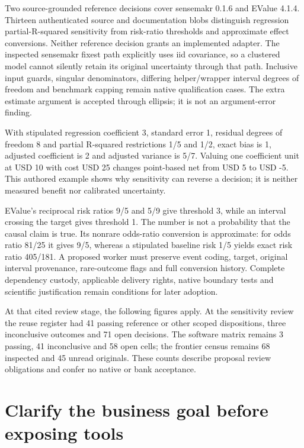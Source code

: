 Two source-grounded reference decisions cover sensemakr 0.1.6 and EValue
4.1.4. Thirteen authenticated source and documentation blobs distinguish
regression partial-R-squared sensitivity from risk-ratio thresholds and
approximate effect conversions. Neither reference decision grants an
implemented adapter. The inspected sensemakr fixest path explicitly uses
iid covariance, so a clustered model cannot silently retain its original
uncertainty through that path. Inclusive input guards, singular
denominators, differing helper/wrapper interval degrees of freedom and
benchmark capping remain native qualification cases. The extra estimate
argument is accepted through ellipsis; it is not an argument-error
finding. \citep{exec23_sensitivity_sensemakr}

With stipulated regression coefficient 3, standard error 1, residual
degrees of freedom 8 and partial R-squared restrictions 1/5 and 1/2,
exact bias is 1, adjusted coefficient is 2 and adjusted variance is 5/7.
Valuing one coefficient unit at USD 10 with cost USD 25 changes
point-based net from USD 5 to USD -5. This authored example shows why
sensitivity can reverse a decision; it is neither measured benefit nor
calibrated uncertainty. \citep{exec23_sensitivity_reference}

EValue's reciprocal risk ratios 9/5 and 5/9 give threshold 3, while an
interval crossing the target gives threshold 1. The number is not a
probability that the causal claim is true. Its nonrare odds-ratio
conversion is approximate: for odds ratio 81/25 it gives 9/5, whereas a
stipulated baseline risk 1/5 yields exact risk ratio 405/181. A proposed
worker must preserve event coding, target, original interval provenance,
rare-outcome flags and full conversion history. Complete dependency
custody, applicable delivery rights, native boundary tests and
scientific justification remain conditions for later adoption.
\citep{exec23_sensitivity_evalue,exec23_sensitivity_reference}

At that cited review stage, the following figures apply. At the
sensitivity review the reuse register had 41 passing reference or other
scoped dispositions, three inconclusive outcomes and 71 open decisions.
The software matrix remains 3 passing, 41 inconclusive and 58 open
cells; the frontier census remains 68 inspected and 45 unread originals.
These counts describe proposal review obligations and confer no native
or bank acceptance.
\citep{sp23sensitivity_reader,sp23sensitivity_progress}

\hypertarget{clarify-the-business-goal-before-exposing-tools}{%
\section{Clarify the business goal before exposing
tools}\label{clarify-the-business-goal-before-exposing-tools}}

